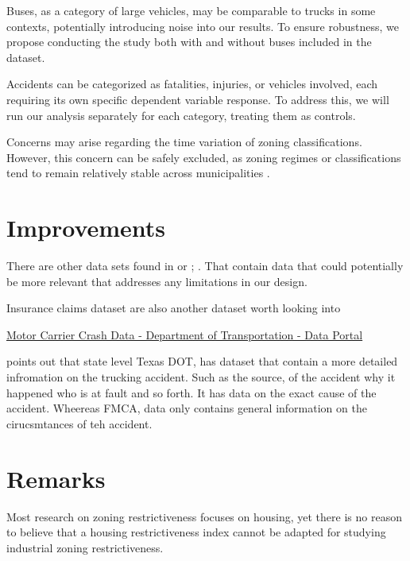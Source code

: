\documentclass[
  12pt]{article}
\begin{document}
Buses, as a category of large vehicles, may be comparable to trucks in
some contexts, potentially introducing noise into our results. To ensure
robustness, we propose conducting the study both with and without buses
included in the dataset.

Accidents can be categorized as fatalities, injuries, or vehicles
involved, each requiring its own specific dependent variable response.
To address this, we will run our analysis separately for each category,
treating them as controls.

Concerns may arise regarding the time variation of zoning
classifications. However, this concern can be safely excluded, as zoning
regimes or classifications tend to remain relatively stable across
municipalities \citep{mclaughlinLandUseRegulation2012}.

\section{\texorpdfstring{\textbf{Improvements}}{Improvements}}\label{improvements}

There are other data sets found in \citep{NHTSAFileDownloads} or
\citep{FatalityAnalysisReporting} ; . That contain data that could
potentially be more relevant that addresses any limitations in our
design.

Insurance claims dataset are also another dataset worth looking into

\href{https://data.transportation.gov/Trucking-and-Motorcoaches/Motor-Carrier-Crash-Data-/b8e5-isfj/about_data}{Motor
Carrier Crash Data - \textbar{} Department of Transportation - Data
Portal}

\citet{liangSafetyInspectionsImprove2021} points out that state level
Texas DOT, has dataset that contain a more detailed infromation on the
trucking accident. Such as the source, of the accident why it happened
who is at fault and so forth. It has data on the exact cause of the
accident. Wheereas FMCA, data only contains general information on the
cirucsmtances of teh accident.

\section{Remarks}\label{remarks}

Most research on zoning restrictiveness focuses on housing, yet there is
no reason to believe that a housing restrictiveness index cannot be
adapted for studying industrial zoning restrictiveness.
\end{document}
